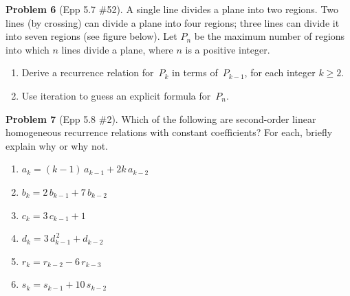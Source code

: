 \documentclass[11pt]{article}
\begin{document}
\noindent\textbf{Problem 6} (Epp 5.7 \#52). \;
A single line divides a plane into two regions.  Two lines
(by crossing) can divide a plane into four regions; three
lines can divide it into seven regions (see figure below).
Let $P_n$ be the maximum number of regions into which $n$
lines divide a plane, where $n$ is a positive integer.

\begin{center}
\end{center}

\begin{enumerate}[label=\textbf{\alph*.},itemsep=4pt]
  \item Derive a recurrence relation for~$P_k$ in terms
        of~$P_{k-1}$, for each integer $k \ge 2$.
  \item Use iteration to guess an explicit formula
        for~$P_n$.
\end{enumerate}

\bigskip

\noindent\textbf{Problem 7} (Epp 5.8 \#2). \;
Which of the following are second-order linear homogeneous
recurrence relations with constant coefficients?  For each,
briefly explain why or why not.

\begin{enumerate}[label=\textbf{\alph*.},itemsep=3pt]
  \item $a_k = (k-1)\,a_{k-1} + 2k\,a_{k-2}$
  \item $b_k = 2\,b_{k-1} + 7\,b_{k-2}$
  \item $c_k = 3\,c_{k-1} + 1$
  \item $d_k = 3\,d_{k-1}^{\,2} + d_{k-2}$
  \item $r_k = r_{k-2} - 6\,r_{k-3}$
  \item $s_k = s_{k-1} + 10\,s_{k-2}$
\end{enumerate}
\end{document}
